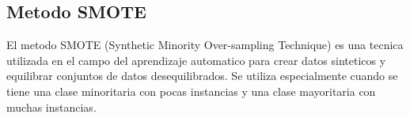 \documentclass[12pt]{article}
\begin{document}


\subsection{Metodo SMOTE}
El metodo SMOTE (Synthetic Minority Over-sampling Technique) es una tecnica utilizada en el campo del aprendizaje automatico para crear datos sinteticos y equilibrar conjuntos de datos desequilibrados. Se utiliza especialmente cuando se tiene una clase minoritaria con pocas instancias y una clase mayoritaria con muchas instancias.
\end{document}
